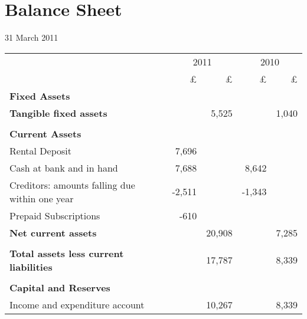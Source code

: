 \section{Balance Sheet}
31 March 2011

\begin{center}
\begin{tabular}{  l  r  r r r}
\toprule
                            & \multicolumn{2}{c}{2011} &  \multicolumn{2}{c}{2010} \\
\cmidrule(r){2-3} \cmidrule(r){4-5}
                                                & £      & £     & £     & £     \\
{\bf Fixed Assets}                              &        &       &       &       \\
{\bf Tangible fixed assets}                     &        & 5,525 &       & 1,040 \\
\cmidrule(r){2-3} \cmidrule(r){4-5} \\
{\bf Current Assets}                            &        &       &       &       \\
Rental Deposit                                  & 7,696  &       &       &       \\
Cash at bank and in hand                        & 7,688  &       & 8,642 &       \\
Creditors: amounts falling due within one year  & -2,511 &       & -1,343&      \\
Prepaid Subscriptions                           & -610   &       &       &      \\
{\bf Net current assets}                        &        & 20,908 &       & 7,285 \\
\cmidrule(r){2-3} \cmidrule(r){4-5} \\
{\bf Total assets less current liabilities}     &        & 17,787 &       & 8,339 \\
\cmidrule(r){2-3} \cmidrule(r){4-5}  \\
{\bf Capital and Reserves}&\\
Income and expenditure account                  &        & 10,267 &       & 8,339 \\
\bottomrule
\end{tabular}

\end{center}


